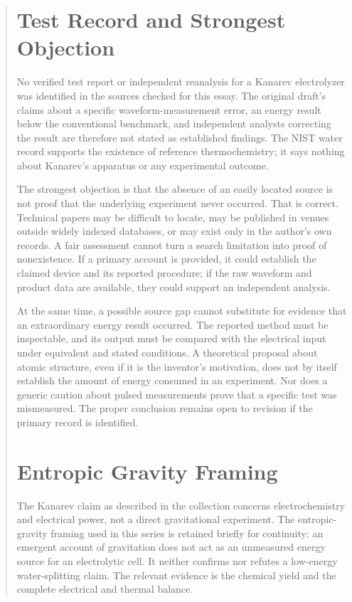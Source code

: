 \documentclass[11pt]{article}
\begin{document}
\begin{abstract}
\section{Test Record and Strongest Objection}

No verified test report or independent reanalysis for a Kanarev electrolyzer was identified in the sources checked for this essay. The original draft's claims about a specific waveform-measurement error, an energy result below the conventional benchmark, and independent analysts correcting the result are therefore not stated as established findings. The NIST water record supports the existence of reference thermochemistry; it says nothing about Kanarev's apparatus or any experimental outcome.

The strongest objection is that the absence of an easily located source is not proof that the underlying experiment never occurred. That is correct. Technical papers may be difficult to locate, may be published in venues outside widely indexed databases, or may exist only in the author's own records. A fair assessment cannot turn a search limitation into proof of nonexistence. If a primary account is provided, it could establish the claimed device and its reported procedure; if the raw waveform and product data are available, they could support an independent analysis.

At the same time, a possible source gap cannot substitute for evidence that an extraordinary energy result occurred. The reported method must be inspectable, and its output must be compared with the electrical input under equivalent and stated conditions. A theoretical proposal about atomic structure, even if it is the inventor's motivation, does not by itself establish the amount of energy consumed in an experiment. Nor does a generic caution about pulsed measurements prove that a specific test was mismeasured. The proper conclusion remains open to revision if the primary record is identified.

\section{Entropic Gravity Framing}

The Kanarev claim as described in the collection concerns electrochemistry and electrical power, not a direct gravitational experiment. The entropic-gravity framing used in this series is retained briefly for continuity: an emergent account of gravitation does not act as an unmeasured energy source for an electrolytic cell. It neither confirms nor refutes a low-energy water-splitting claim. The relevant evidence is the chemical yield and the complete electrical and thermal balance.


\end{abstract}
\end{document}
